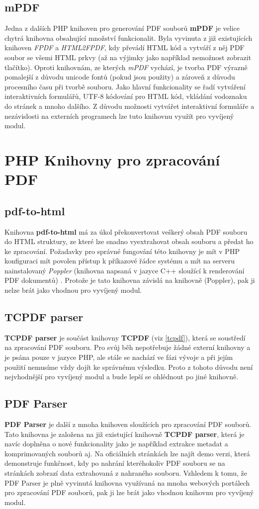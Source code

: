 \subsection{mPDF}
Jedna z dalších PHP knihoven pro generování PDF souborů \textbf{mPDF} je velice chytrá knihovna obsahující množství funkcionalit. Byla vyvinuta z již existujících knihoven \textit{FPDF} a \textit{HTML2FPDF}, kdy převádí HTML kód a vytváří z něj PDF soubor se všemi HTML prkvy (až na výjimky jako například nemožnost zobrazit tlačítko). Oproti knihovnám, ze kterých \textit{mPDF} vychází, je tvorba PDF výrazně pomalejší z důvodu unicode fontů (pokud jsou použity) a zároveň z důvodu procesního času při tvorbě souboru. Jako hlavní funkcionality se řadí vytváření interaktivních formulářů, UTF-8 kódování pro HTML kód, vkládání vodoznaku do stránek a mnoho dalšího. Z důvodu možnosti vytvářet interaktivní formuláře a nezávislosti na externích programech lze tuto knihovnu využít pro vyvíjený modul.
\section{PHP Knihovny pro zpracování PDF}
\subsection{pdf-to-html}
Knihovna \textbf{pdf-to-html} má za úkol překonvertovat veškerý obsah PDF souboru do HTML struktury, ze které lze snadno vyextrahovat obsah souboru a předat ho ke zpracování. Požadavky pro správné fungování této knihovny je mít v PHP konfiguraci mít povolen přístup k příkazové řádce systému a mít na serveru nainstalovaný \textit{Poppler} (knihovna napsaná v jazyce C++ sloužící k renderování PDF dokumentů) \cite{pdfToHtml}. Protože je tato knihovna závislá na knihovně (Poppler), pak ji nelze brát jako vhodnou pro vyvíjený modul. 
\subsection{TCPDF parser}
\textbf{TCPDF parser} je součást knihovny \textbf{TCPDF} (viz \ref{tcpdf}), která se soustředí na zpracování PDF souboru. Pro svůj běh nepotřebuje žádné externí knihovny a je psána pouze v jazyce PHP, ale stále se nachází ve fázi vývoje a při jejím použití nemusíme vždy dojít ke správnému výsledku. Proto z tohoto důvodu není nejvhodnější pro vyvíjený modul a bude lepší se ohlédnout po jiné knihovně.
\subsection{PDF Parser}
\textbf{PDF Parser} je další z mnoha knihoven sloužících pro zpracování PDF souborů. Tato knihovna je založena na již existující knihovně \textbf{TCPDF parser}, která je navíc doplněna o nové funkcionality jako je například extrakce metadat a komprimovaných souborů aj. Na oficiálních stránkách lze najít demo verzi, která demonstruje funkčnost, kdy po nahrání kteréhokoliv PDF souboru se na stránkách zobrazí data extrahovaná z nahraného souboru. Vzhledem k tomu, že PDF Parser je plně vyvinutá knihovna využívaná na mnoha webových portálech pro zpracování PDF souborů, pak ji lze brát jako vhodnou knihovnu pro vyvíjený modul.
